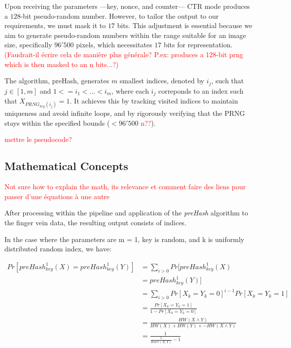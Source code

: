 Upon receiving the parameters —key, nonce, and counter— CTR mode produces a \(128\)-bit pseudo-random number. However, to tailor the output to our requirements, we must mask it to \(17\) bits. This adjustment is essential because we aim to generate pseudo-random numbers within the range suitable for an image size, specifically \(96'500\) pixels, which necessitates \(17\) bits for representation. \textcolor{red}{(Faudrait-il écrire cela de manière plus générale? P.ex: produces a 128-bit prng which is then masked to an n bits...?)}

The algorithm, preHash, generates \(m\) smallest indices, denoted by \(i_j\), such that \(j\in{[1, m]} \) and \(1 <= i_1 < ... < i_m\), where each \(i_j\) correponds to an index such that \(X_{PRNG_{key}(i_j)} = 1\). It achieves this by tracking visited indices to maintain uniqueness and avoid infinite loops, and by rigorously verifying that the PRNG stays within the specified bounds (\(< 96'500\) \textcolor{red}{n??}).   

\textcolor{red}{mettre le pseudocode?}

\subsection{Mathematical Concepts}
\textcolor{red}{Not sure how to explain the math, its relevance et comment faire des liens pour passer d'une équations à une autre}

After processing within the pipeline and application of the \textit{preHash} algorithm to the finger vein data, the resulting output consists of indices. 

In the case where the parameters are m = 1, key is random, and k is uniformly distributed random index, we have: 

\begin{equation} \label{eq:preHash1}
    \begin{aligned}
        Pr[preHash_{key}^1(X) = preHash_{key}^1(Y)] &= \sum_{i > 0} Pr[preHash_{key}^1(X)\\
        &= preHash_{key}^1(Y)]\\
        &= \sum_{i > 0} Pr[X_k = Y_k = 0]^{i - 1} Pr[X_k = Y_k = 1]\\
        &= \frac{Pr[X_k = Y_k = 1]}{1 - Pr[X_k = Y_k = 0]}\\
        &= \frac{HW(X \land Y)}{HW(X) + HW(Y) + - HW(X \land Y)}\\
        &= \frac{1}{\frac{1}{Score(X, Y)} - 1}
    \end{aligned}
\end{equation}

